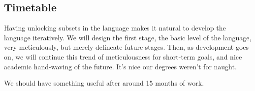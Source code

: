 \subsection{Timetable}
Having unlocking subsets in the language makes it natural to develop the 
language iteratively. We will design the first stage, the basic level of the 
language, very meticulously, but merely delineate future stages. Then, as 
development goes on, we will continue this trend of meticulousness for 
short-term goals, and nice academic hand-waving of the future. It's nice our 
degrees weren't for naught.

We should have something useful after around 15 months of work.
